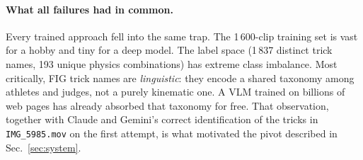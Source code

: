 \paragraph{What all failures had in common.}
Every trained approach fell into the same trap. The 1\,600-clip training
set is vast for a hobby and tiny for a deep model. The label space (1\,837
distinct trick names, 193 unique physics combinations) has extreme class
imbalance. Most critically, FIG trick names are \emph{linguistic}: they
encode a shared taxonomy among athletes and judges, not a purely kinematic
one. A VLM trained on billions of web pages has already absorbed that
taxonomy for free. That observation, together with Claude and Gemini's
correct identification of the tricks in \texttt{IMG\_5985.mov} on the first
attempt, is what motivated the pivot described in Sec.~\ref{sec:system}.
